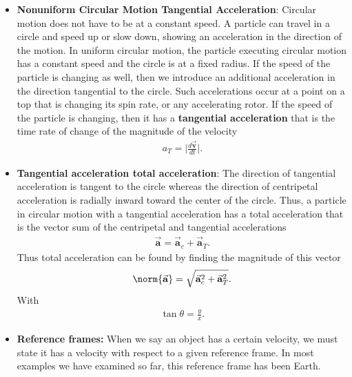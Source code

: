 \documentclass{report}
\begin{document}
\begin{itemize}
            \item \textbf{Nonuniform Circular Motion Tangential Acceleration}:
                Circular motion does not have to be at a constant speed. A particle can travel in a circle and speed up or slow down, showing an acceleration in the direction of the motion.
                \smallbreak \noindent
                In uniform circular motion, the particle executing circular motion has a constant speed and the circle is at a fixed radius. If the speed of the particle is changing as well, then we introduce an additional acceleration in the direction tangential to the circle. Such accelerations occur at a point on a top that is changing its spin rate, or any accelerating rotor.  If the speed of the particle is changing, then it has a \textbf{tangential acceleration} that is the time rate of change of the magnitude of the velocity
                \begin{align*}
                    a_{T} = \bigg\lvert  \frac{d\vec{\mathbf{v}}}{dt} \bigg\rvert
                .\end{align*}
            \item \textbf{Tangential acceleration total acceleration}: 
                The direction of tangential acceleration is tangent to the circle whereas the direction of centripetal acceleration is radially inward toward the center of the circle. Thus, a particle in circular motion with a tangential acceleration has a total acceleration that is the vector sum of the centripetal and tangential accelerations
                \begin{align*}
                    \vec{\mathbf{a}} = \vec{\mathbf{a}}_{c} + \vec{\mathbf{a}}_{T}
                .\end{align*}
                Thus total acceleration can be found by finding the magnitude of this vector
                \begin{align*}
                    \norm{\vec{\mathbf{a}}} = \sqrt{\vec{\mathbf{a}}_{c}^{2} + \vec{\mathbf{a}}_{T}^{2}}
                .\end{align*}
                With 
                \begin{align*}
                    \tan{\theta} = \frac{y}{x}
                .\end{align*}
            \item \textbf{Reference frames:} When we say an object has a certain velocity, we must state it has a velocity with respect to a given reference frame. In most examples we have examined so far, this reference frame has been Earth.

\end{itemize}
\end{document}
